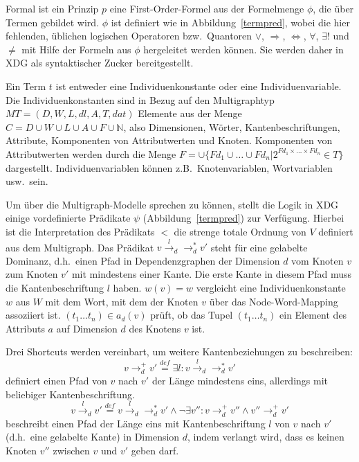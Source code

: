 Formal ist ein Prinzip $p$ eine First-Order-Formel aus der Formelmenge
$\phi$, die \"uber Termen gebildet wird. $\phi$ ist definiert wie in
Abbildung~\ref{termpred}, wobei die hier fehlenden, \"ublichen
logischen Operatoren bzw.\ Quantoren $\vee$, $\Rightarrow$,
$\Leftrightarrow$, $\forall$, $\exists !$ und $\neq$ mit Hilfe der Formeln
aus $\phi$ hergeleitet werden k\"onnen. Sie werden daher in XDG als
syntaktischer Zucker bereitgestellt.

Ein Term $t$ ist entweder eine Individuenkonstante oder eine
Individuenvariable.  Die Individuenkonstanten sind in Bezug auf den
Multigraphtyp $\mathit{MT} = (D,W,L,\mathit{dl},A,T,\mathit{dat})$ Elemente aus der Menge $C = D
\cup W \cup L \cup A \cup F \cup \mathbb{N}$, also Dimensionen,
W\"orter, Kantenbeschriftungen, Attribute, Komponenten von
Attributwerten und Knoten.  Komponenten von Attributwerten werden
durch die Menge $F = \cup \{\mathit{Fd}_{1} \cup \ldots \cup \mathit{Fd}_n | 2^{\mathit{Fd}_1
\times \ldots \times \mathit{Fd}_n} \in T\}$ dargestellt.  Individuenvariablen
k\"onnen z.B.\ Knotenvariablen, Wortvariablen usw.\ sein.

Um \"uber die Multigraph-Modelle sprechen zu k\"onnen, stellt die
Logik in XDG einige vordefinierte Pr\"adikate $\psi$
(Abbildung~\ref{termpred}) zur Verf\"ugung. Hierbei ist die
Interpretation des Pr\"adikats $<$ die strenge totale Ordnung von $V$
definiert aus dem Multigraph.  Das Pr\"adikat $v
\overset{l}{\rightarrow}_d \rightarrow_d^* v'$ steht f\"ur eine
gelabelte Dominanz, d.h.\ einen Pfad in Dependenzgraphen der Dimension
$d$ vom Knoten $v$ zum Knoten $v'$ mit mindestens einer Kante. Die erste
Kante in diesem Pfad muss die Kantenbeschriftung $l$ haben.  $w(v) = w$
vergleicht eine Individuenkonstante $w$ aus $W$ mit dem Wort, mit dem der
Knoten $v$ \"uber das Node-Word-Mapping assoziiert ist. $(t_1 \ldots
t_n) \in a_d(v)$ pr\"uft, ob das Tupel $(t_1 \ldots t_n)$ ein Element
des Attributs $a$ auf Dimension $d$ des Knotens $v$ ist.

Drei Shortcuts werden vereinbart, um weitere Kantenbeziehungen zu
beschreiben:
$$ v \rightarrow _d ^+ v' \overset{\mathit{def}}{=} \exists l: v
\overset{l}{\rightarrow}_d \rightarrow_d^* v'$$
definiert einen Pfad von $v$ nach $v'$ der L\"ange mindestens eins,
allerdings mit beliebiger Kantenbeschriftung.
$$v \overset{l}{\rightarrow}_d v' \overset{\mathit{def}}{=} v
\overset{l}{\rightarrow}_d \rightarrow_d^* v' \wedge \neg \exists v''
: v \rightarrow_d^+ v'' \wedge v'' \rightarrow_d^+ v'$$ beschreibt
einen Pfad der L\"ange eins mit Kantenbeschriftung $l$ von $v$ nach $v'$
(d.h.\ eine gelabelte Kante) in Dimension $d$, indem verlangt wird, dass
es keinen Knoten $v''$ zwischen $v$ und $v'$ geben darf.

